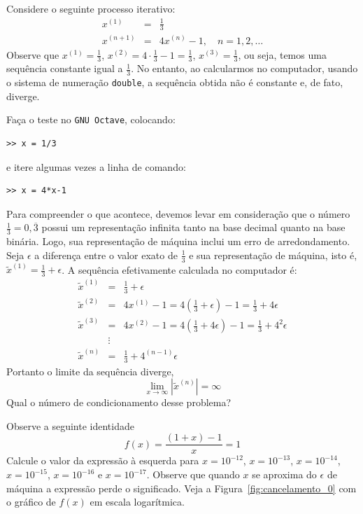 \begin{ex} Considere o seguinte processo iterativo:
  \begin{eqnarray}
    x^{(1)} &=& \frac{1}{3}\\
    x^{(n+1)} &=& 4x^{(n)}-1,\quad n=1, 2, \ldots
  \end{eqnarray}
Observe que $x^{(1)}=\frac{1}{3}$, $x^{(2)}=4\cdot \frac{1}{3}-1=\frac{1}{3}$, $x^{(3)}=\frac{1}{3}$, ou seja, temos uma sequência constante igual a $\frac{1}{3}$. No entanto, ao calcularmos no computador, usando o sistema de numeração \verb+double+, a sequência obtida não é constante e, de fato, diverge.

Faça o teste no \verb+GNU Octave+, colocando:
\begin{verbatim}
>> x = 1/3
\end{verbatim}
e itere algumas vezes a linha de comando:
\begin{verbatim}
>> x = 4*x-1
\end{verbatim}


Para compreender o que acontece, devemos levar em consideração que o número $\frac{1}{3}=0,\overline{3}$ possui um representação infinita tanto na base decimal quanto na base binária. Logo, sua representação de máquina inclui um erro de arredondamento. Seja $\epsilon$ a diferença entre o valor exato de $\frac{1}{3}$ e sua representação de máquina, isto é, $\tilde{x}^{(1)}=\frac{1}{3}+\epsilon$. A sequência efetivamente calculada no computador é:
\begin{eqnarray}
\tilde{x}^{(1)}&=&\frac{1}{3}+\epsilon\\
\tilde{x}^{(2)}&=&4x^{(1)}-1=4\left(\frac{1}{3}+\epsilon\right)-1=\frac{1}{3}+4\epsilon\\
\tilde{x}^{(3)}&=&4x^{(2)}-1=4\left(\frac{1}{3}+4\epsilon\right)-1=\frac{1}{3}+4^2\epsilon\\
&\vdots&\\
\tilde{x}^{(n)}&=&\frac{1}{3}+4^{(n-1)}\epsilon
\end{eqnarray}
Portanto o limite da sequência diverge,
\begin{equation}
\lim_{x\to\infty}|\tilde{x}^{(n)}|=\infty
\end{equation}
Qual o número de condicionamento desse problema?
\end{ex}


\begin{ex}\label{ex:cancelamento_0}Observe a seguinte identidade
\begin{equation}
f(x)=\frac{(1+x)-1}{x}=1
\end{equation}
Calcule o valor da expressão à esquerda para $x=10^{-12}$, $x=10^{-13}$, $x=10^{-14}$, $x=10^{-15}$, $x=10^{-16}$ e $x=10^{-17}$. Observe que quando $x$ se aproxima do $\epsilon$ de máquina a expressão perde o significado. Veja a Figura~\ref{fig:cancelamento_0} com o gráfico de $f(x)$ em escala logarítmica.
\end{ex}

